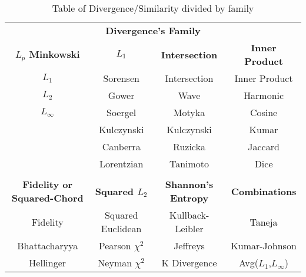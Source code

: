 \documentclass[conference]{IEEEtran}
\begin{document}
\begin{table}[!h]
	\tiny 
	\centering
	\caption{Table of Divergence/Similarity divided by family}
	\label{tab01}
	\begin{tabular}{cccc}
		\multicolumn{4}{c}{\textbf{Divergence's Family}}                                                                                                  \\
		\textbf{$L_p$ Minkowski}           & \textbf{$L_1$}         & \textbf{Intersection}      & \textbf{Inner Product}                    \\ \hline \hline
		$L_1$                              & Sorensen               & Intersection               & Inner Product                             \\
		$L_2$                              & Gower                  & Wave                       & Harmonic                                  \\
		$L_\infty$                         & Soergel                & Motyka                     & Cosine                                    \\
				                           & Kulczynski             & Kulczynski                 & Kumar                                     \\
										   & Canberra               & Ruzicka                    & Jaccard                                   \\
										   & Lorentzian             & Tanimoto                   & Dice                                      \\
										   &                        &                            &                                           \\
		\textbf{Fidelity or Squared-Chord} & \textbf{Squared $L_2$} & \textbf{Shannon's Entropy} & \multicolumn{1}{c}{\textbf{Combinations}} \\ \hline \hline
		Fidelity                           & Squared Euclidean      & Kullback-Leibler           & \multicolumn{1}{c}{Taneja}                \\
		Bhattacharyya                      & Pearson $\chi^2$       & Jeffreys                   & \multicolumn{1}{c}{Kumar-Johnson}         \\
		Hellinger                          & Neyman $\chi^2$        & K Divergence               & \multicolumn{1}{c}{Avg($L_1$,$L_\infty$)} \\

\end{tabular}
\end{table}
\end{document}

